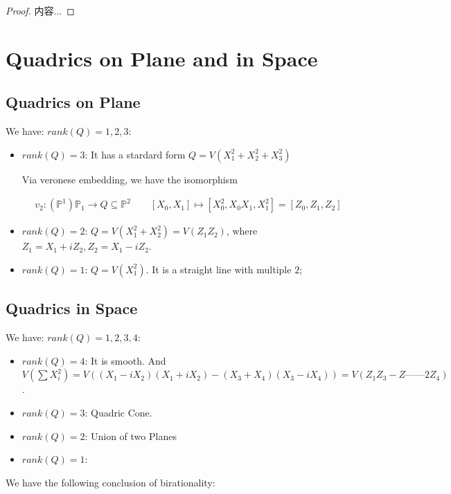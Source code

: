 \documentclass[Total.tex]{subfiles}
\begin{document}
			\begin{proof}
				内容...
			\end{proof}
			
			\section{Quadrics on Plane and in Space}
			
			\subsection{Quadrics on Plane}
			
			We have: $rank(Q)=1,2,3$:
			
			\begin{itemize}
				\item $rank(Q)=3$: It has a stardard form $Q=V(X_1^2+X_2^2+X_3^2)$
				
				Via veronese embedding, we have the isomorphism
				
				\begin{gather*}
					v_2:(\mathbb{P}^1)\mathbb{P}_1\rightarrow Q\subseteq \mathbb{P}^2\qquad  [X_0,X_1]\mapsto [X_0^2,X_0X_1,X_1^2]=[Z_0,Z_1,Z_2]
				\end{gather*}
				
				\item $rank(Q)=2$: $Q=V(X_1^2+X_2^2)=V(Z_1Z_2)$, where $Z_1=X_1+iZ_2,Z_2=X_1-iZ_2$. 
				
				\item $rank(Q)=1$: $Q=V(X_1^2)$. It is a straight line with multiple $2$;
			\end{itemize}
			
			\subsection{Quadrics in Space}
			
			We have: $rank(Q)=1,2,3,4$:
			
			\begin{itemize}
				\item $rank(Q)=4$: It is smooth. And $V(\sum X_i^2)=V((X_1-iX_2)(X_1+iX_2)-(X_3+X_4)(X_3-iX_4))=V(Z_1Z_3-Z——2Z_4)$. 
				\item $rank(Q)=3$: Quadric Cone.
				\item $rank(Q)=2$: Union of two Planes
				\item $rank(Q)=1$: 
			\end{itemize}
			
			We have the following conclusion of birationality: 
			
\end{document}
